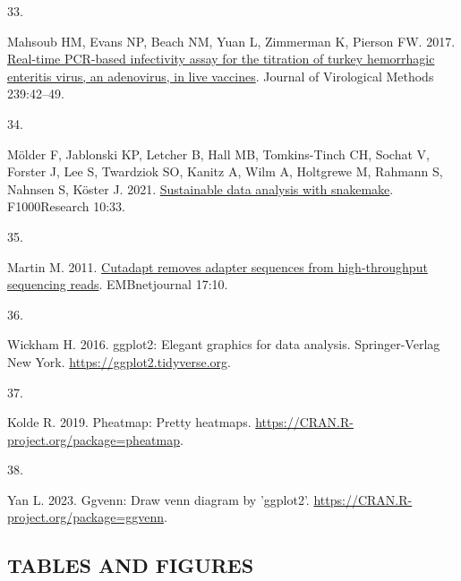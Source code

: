 \documentclass[
]{article}
\newlength{\cslhangindent}
\newlength{\csllabelwidth}
\newenvironment{CSLReferences}[2] %
 {\begin{list}{}{%
  \setlength{\itemindent}{0pt}
  \setlength{\leftmargin}{0pt}
  \setlength{\parsep}{0pt}
  \ifodd #1
   \setlength{\leftmargin}{\cslhangindent}
   \setlength{\itemindent}{-1\cslhangindent}
  \fi
  \setlength{\itemsep}{#2\baselineskip}}}
 {\end{list}}
\newcommand{\CSLLeftMargin}[1]{\parbox[t]{\csllabelwidth}{\strut#1\strut}}
\newcommand{\CSLRightInline}[1]{\parbox[t]{\linewidth - \csllabelwidth}{\strut#1\strut}}
\begin{document}
\begin{CSLReferences}{0}{1}
\CSLLeftMargin{33. }%
\CSLRightInline{Mahsoub HM, Evans NP, Beach NM, Yuan L, Zimmerman K,
Pierson FW. 2017.
\href{https://doi.org/10.1016/j.jviromet.2016.11.002}{Real-time
{PCR}-based infectivity assay for the titration of turkey hemorrhagic
enteritis virus, an adenovirus, in live vaccines}. Journal of
Virological Methods 239:42--49.}

\CSLLeftMargin{34. }%
\CSLRightInline{Mölder F, Jablonski KP, Letcher B, Hall MB,
Tomkins-Tinch CH, Sochat V, Forster J, Lee S, Twardziok SO, Kanitz A,
Wilm A, Holtgrewe M, Rahmann S, Nahnsen S, Köster J. 2021.
\href{https://doi.org/10.12688/f1000research.29032.2}{Sustainable data
analysis with snakemake}. F1000Research 10:33.}

\CSLLeftMargin{35. }%
\CSLRightInline{Martin M. 2011.
\href{https://doi.org/10.14806/ej.17.1.200}{Cutadapt removes adapter
sequences from high-throughput sequencing reads}. EMBnetjournal 17:10.}

\CSLLeftMargin{36. }%
\CSLRightInline{Wickham H. 2016. ggplot2: Elegant graphics for data
analysis. Springer-Verlag New York.
\url{https://ggplot2.tidyverse.org}.}

\CSLLeftMargin{37. }%
\CSLRightInline{Kolde R. 2019. Pheatmap: Pretty heatmaps.
\url{https://CRAN.R-project.org/package=pheatmap}.}

\CSLLeftMargin{38. }%
\CSLRightInline{Yan L. 2023. Ggvenn: Draw venn diagram by 'ggplot2'.
\url{https://CRAN.R-project.org/package=ggvenn}.}

\end{CSLReferences}

\setlength{\parindent}{0in}
\setlength{\leftskip}{0in}
\newpage

\newpage

\subsection{TABLES AND FIGURES}\label{tables-and-figures}
\end{document}
